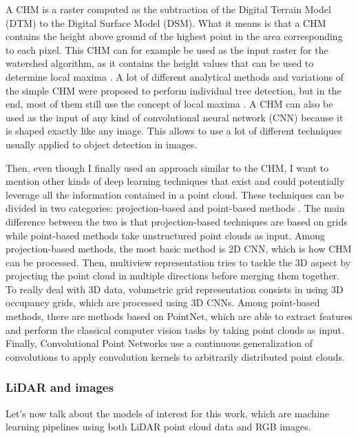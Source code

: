 \documentclass[
  letterpaper,
  DIV=11,
  numbers=noendperiod]{scrartcl}
\begin{document}
A CHM is a raster computed as the subtraction of the Digital Terrain
Model (DTM) to the Digital Surface Model (DSM). What it means is that a
CHM contains the height above ground of the highest point in the area
corresponding to each pixel. This CHM can for example be used as the
input raster for the watershed algorithm, as it contains the height
values that can be used to determine local maxima
\autocite{lidar_watershed}. A lot of different analytical methods and
variations of the simple CHM were proposed to perform individual tree
detection, but in the end, most of them still use the concept of local
maxima \autocite{lidar_benchmark,lidar_benchmark_2}. A CHM can also be
used as the input of any kind of convolutional neural network (CNN)
because it is shaped exactly like any image. This allows to use a lot of
different techniques usually applied to object detection in images.

Then, even though I finally used an approach similar to the CHM, I want
to mention other kinds of deep learning techniques that exist and could
potentially leverage all the information contained in a point cloud.
These techniques can be divided in two categories: projection-based and
point-based methods \autocite{lidar_classification}. The main difference
between the two is that projection-based techniques are based on grids
while point-based methods take unstructured point clouds as input. Among
projection-based methods, the most basic method is 2D CNN, which is how
CHM can be processed. Then, multiview representation tries to tackle the
3D aspect by projecting the point cloud in multiple directions before
merging them together. To really deal with 3D data, volumetric grid
representation consists in using 3D occupancy grids, which are processed
using 3D CNNs. Among point-based methods, there are methods based on
PointNet, which are able to extract features and perform the classical
computer vision tasks by taking point clouds as input. Finally,
Convolutional Point Networks use a continuous generalization of
convolutions to apply convolution kernels to arbitrarily distributed
point clouds.

\subsubsection{LiDAR and images}\label{lidar-and-images}

Let's now talk about the models of interest for this work, which are
machine learning pipelines using both LiDAR point cloud data and RGB
images.
\end{document}
